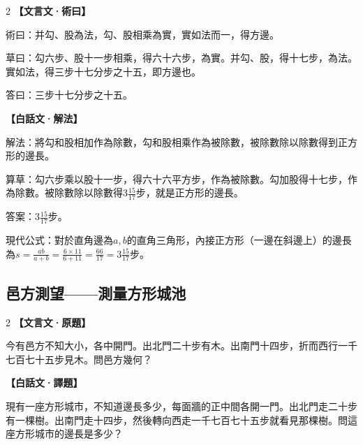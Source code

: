 \documentclass[11pt,a4paper]{article}
\newcommand{\zhc}{}[1]{{\CJKfamily{\CJKrmdefault}#1}}  %
\newcommand{\zhm}[1]{{\CJKfamily{\CJKrmdefault}#1}}  %
\newenvironment{prob bilingual}[1][]{%
  \begin{paracol}{2}%
  \setlength{\columnseprule}{0.4pt}%
}{%
  \end{paracol}%
  \medskip%
}
\begin{document}
\begin{paracol}{2}
\switchcolumn[0]
\noindent\textbf{\textcolor{notecolor}{\zhc{【文言文·術曰】}}}\par\smallskip
\zhc{
術曰：并勾、股為法，勾、股相乘為實，實如法而一，得方邊。

草曰：勾六步、股十一步相乘，得六十六步，為實。并勾、股，得十七步，為法。實如法，得三步十七分步之十五，即方邊也。

答曰：三步十七分步之十五。
}

\switchcolumn[1]
\noindent\textbf{\textcolor{notecolor}{\zhm{【白話文·解法】}}}\par\smallskip
\zhm{
解法：將勾和股相加作為除數，勾和股相乘作為被除數，被除數除以除數得到正方形的邊長。

算草：勾六步乘以股十一步，得六十六平方步，作為被除數。勾加股得十七步，作為除數。被除數除以除數得$3\frac{15}{17}$步，就是正方形的邊長。

答案：$3\frac{15}{17}$步。

現代公式：對於直角邊為$a, b$的直角三角形，內接正方形（一邊在斜邊上）的邊長為$s = \frac{ab}{a+b} = \frac{6 \times 11}{6 + 11} = \frac{66}{17} = 3\frac{15}{17}$步。
}
\end{paracol}

\vspace{0.5cm}

\subsection{\zhc{邑方測望——測量方形城池}}

\begin{paracol}{2}
\switchcolumn[0]
\noindent\textbf{\textcolor{notecolor}{\zhc{【文言文·原題】}}}\par\smallskip
\zhc{
今有邑方不知大小，各中開門。出北門二十步有木。出南門十四步，折而西行一千七百七十五步見木。問邑方幾何？
}

\switchcolumn[1]
\noindent\textbf{\textcolor{notecolor}{\zhm{【白話文·譯題】}}}\par\smallskip
\zhm{
現有一座方形城市，不知道邊長多少，每面牆的正中間各開一門。出北門走二十步有一棵樹。出南門走十四步，然後轉向西走一千七百七十五步就看見那棵樹。問這座方形城市的邊長是多少？
}
\end{paracol}

\medskip
\end{document}
